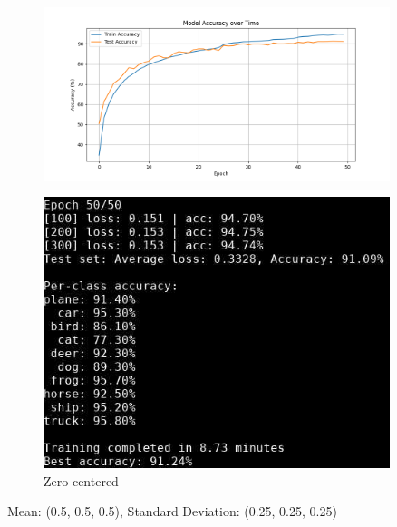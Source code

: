 \begin{frame}
\begin{columns}
    \begin{column}{0.4\textwidth}
        \vspace{-0.1cm}
        \begin{figure}[t]
            \centering
            \vspace{-0.4cm}
            \includegraphics[width=0.9\textwidth]{media/1stAssignment/cifar10_cnn_zero_accuracy.png}
        \end{figure}
        \vspace{-0.6cm}
        \begin{figure}[t]
            \centering
            \includegraphics[width=0.9\textwidth]{media/1stAssignment/cnn_zero_epoch_50.png}
            \vspace{-0.4cm}
            \caption{Zero-centered}
        \end{figure}
        \vspace{-0.6cm}
        \center \tiny Mean: (0.5, 0.5, 0.5),
        \vspace{-0.3cm}
        \center \tiny Standard Deviation: (0.25, 0.25, 0.25)
    \end{column}
\end{columns}
\end{frame}

